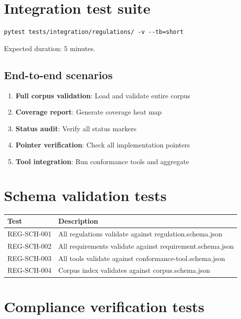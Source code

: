 \section{Integration test suite}

\begin{lstlisting}[basicstyle=\ttfamily\small]
pytest tests/integration/regulations/ -v --tb=short
\end{lstlisting}

Expected duration: 5 minutes.

\subsection{End-to-end scenarios}

\begin{enumerate}
  \item \textbf{Full corpus validation}: Load and validate entire corpus
  \item \textbf{Coverage report}: Generate coverage heat map
  \item \textbf{Status audit}: Verify all status markers
  \item \textbf{Pointer verification}: Check all implementation pointers
  \item \textbf{Tool integration}: Run conformance tools and aggregate
\end{enumerate}

\section{Schema validation tests}

\begin{tabularx}{\linewidth}{@{}l X@{}}
\toprule
\textbf{Test} & \textbf{Description} \\ \midrule
REG-SCH-001 & All regulations validate against regulation.schema.json \\
REG-SCH-002 & All requirements validate against requirement.schema.json \\
REG-SCH-003 & All tools validate against conformance-tool.schema.json \\
REG-SCH-004 & Corpus index validates against corpus.schema.json \\
\bottomrule
\end{tabularx}

\section{Compliance verification tests}

